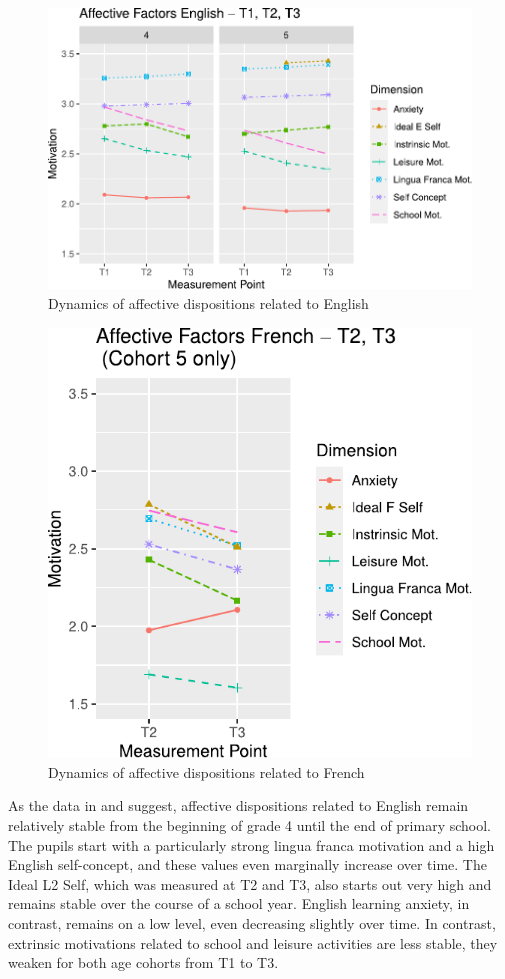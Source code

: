 \documentclass[output=paper]{langsci/langscibook}
\begin{document}
\begin{figure}[p]
\includegraphics[width=\textwidth]{figures/Fig8.1.pdf}
\caption{Dynamics of affective dispositions related to English\label{fig:08:1}}
\end{figure}

\begin{figure}[p]
\includegraphics[width=.66\textwidth]{figures/Fig8.2.pdf}
\caption{Dynamics of affective dispositions related to French\label{fig:08:2}}
\end{figure}

As the data in   and  suggest, affective dispositions related to English remain relatively stable from the beginning of grade 4 until the end of primary school. The pupils start with a particularly strong lingua franca motivation and a high English self-concept, and these values even marginally increase over time. The Ideal L2 Self, which was measured at T2 and T3, also starts out very high and remains stable over the course of a school year. English learning anxiety, in contrast, remains on a low level, even decreasing slightly over time. In contrast, extrinsic motivations related to school and leisure activities are less stable, they weaken for both age cohorts from T1 to T3.
\end{document}
